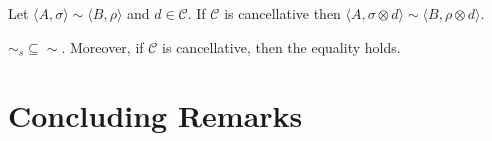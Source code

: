 \documentclass{llncs}
\begin{document}
\begin{proposition}
Let $\langle A,\sigma \rangle \sim \langle B,\rho \rangle$ and $d \in \mathcal{C}$.
If  $\mathcal{C}$ is cancellative then $\langle A,\sigma \otimes d\rangle \sim \langle B,\rho \otimes d \rangle$.
\end{proposition}


%
\begin{theorem}
$\sim_{\mathit{s}} \subseteq \sim$. Moreover, if $\mathcal{C}$ is cancellative, then the equality holds.
\end{theorem}



\section{Concluding Remarks}\label{sec:conclusion}


\end{document}
